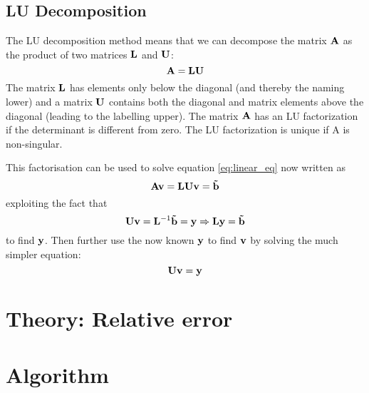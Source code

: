 \documentclass[11pt,a4wide]{article}
\begin{document}

\subsection{LU Decomposition}
The LU decomposition method means that we can decompose the matrix ${\bf A}$ as the product of two matrices ${\bf L}$ and ${\bf U}$:
\[
{\bf A} = {\bf L}{\bf U}
\]
 The matrix ${\bf L}$ has elements only below the diagonal (and thereby the naming lower) and a matrix ${\bf U}$ contains both the diagonal and matrix elements above the diagonal (leading to the labelling upper). The matrix ${\bf A}$ has an LU factorization if the determinant is different from zero. The LU factorization is unique if A is non-singular.
 
 This factorisation can be used to solve equation \ref{eq:linear_eq} now written as
\[
 {\bf A}{\bf v} = {\bf L}{\bf U}{\bf v} = {\bf \tilde{b}}
\]
exploiting the fact that
\[ 
{\bf U}{\bf v} = {\bf L}^{-1}{\bf \tilde{b}} = {\bf y} \Rightarrow {\bf L}{\bf y} = {\bf \tilde{b}}
\]
to find ${\bf y}$. Then further use the now known ${\bf y}$ to find ${\bf v}$ by solving the much simpler equation:
\[
{\bf U}{\bf v} = {\bf y}
\]


\section{Theory: Relative error}

\section{Algorithm}
\end{document}
